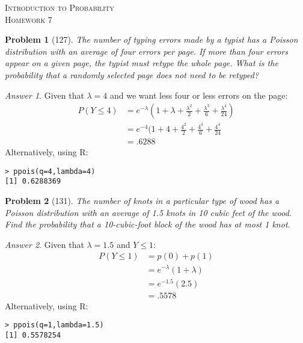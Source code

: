 \documentclass{article}
\theoremstyle{problem}
\newtheorem{prob}{Problem}
\theoremstyle{remark}
\newtheorem*{answer}{Answer}
\begin{document}
\begin{center}
  \textsc{\Large Introduction to Probability}\\[.3cm]
  \textsc{\Large Homework 7}
\end{center}

\begin{prob}[127]
The number of typing errors made by a typist has a Poisson distribution with an average of four errors per page. If more than four errors appear on a given page, the typist must retype the whole page. What is the probability that a randomly selected page does not need to be retyped?
\end{prob}
\begin{answer}
Given that $\lambda = 4$ and we want less four or less errors on the page:
\begin{align*}
P(Y \leq 4) &= e^{-\lambda}(1 + \lambda + \frac{\lambda^2}{2} + \frac{\lambda^3}{6} + \frac{\lambda^4}{24})\\
&= e^{-4} (1 + 4 + \frac{4^2}{2} + \frac{4^3}{6} + \frac{4^4}{24}\\
&= .6288
\end{align*}
Alternatively, using R:
\begin{lstlisting}
> ppois(q=4,lambda=4)
[1] 0.6288369
\end{lstlisting}
\end{answer}
% 

\begin{prob}[131]
The number of knots in a particular type of wood has a Poisson distribution with an average of 1.5 knots in 10 cubic feet of the wood. Find the probability that a 10-cubic-foot block of the wood has at most 1 knot.
\end{prob}
\begin{answer}
Given that $\lambda = 1.5$ and $Y \leq 1$:
\begin{align*}
P(Y \leq 1) &= p(0) + p(1)\\
&= e^{-\lambda}(1 + \lambda)\\
&= e^{-1.5}(2.5)\\
&= .5578
\end{align*}
Alternatively, using R:
\begin{lstlisting}
> ppois(q=1,lambda=1.5)
[1] 0.5578254
\end{lstlisting}
\end{answer}
% 
\end{document}

